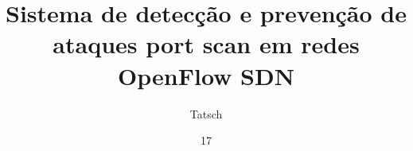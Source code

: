 \documentclass[tc]{unisc}
\title{Sistema de detecção e prevenção de ataques port scan em redes OpenFlow SDN}
\author{Tatsch}{Cássio Giordani}
\date{17}{novembro}{2017}
\begin{document}
\makecapa
\maketitle





%
%




\listoffigures
\listoftables
\lstlistoflistings



\tableofcontents












\end{document}
